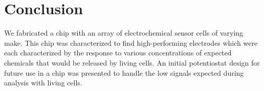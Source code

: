 \chapter{Conclusion}

We fabricated a chip with an array of electrochemical sensor cells of varying make. This chip was characterized to find high-performing electrodes which were each characterized by the response to various concentrations of expected chemicals that would be released by living cells. An initial potentiostat design for future use in a chip was presented to handle the low signals expected during analysis with living cells.
